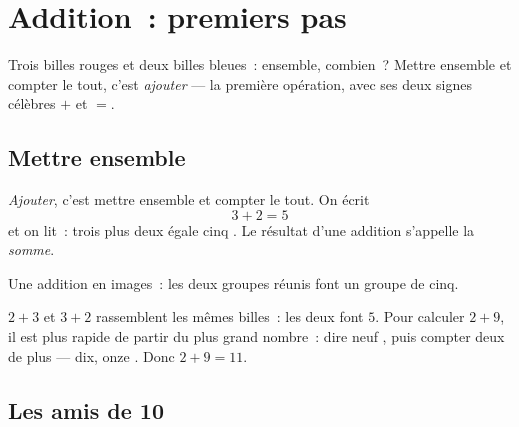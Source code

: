 \chapter{Addition~: premiers pas}\label{ch:g1:addition}

Trois billes rouges et deux billes bleues~: ensemble, combien~?
Mettre ensemble et compter le tout, c'est \emph{ajouter} --- la
première opération, avec ses deux signes célèbres $+$ et $=$.

\section{Mettre ensemble}

\begin{definition}[Addition]\label{def:g1:addition:def}
\emph{Ajouter}, c'est mettre ensemble et compter le tout. On écrit
\[
3 + 2 = 5
\]
et on lit~: \guillemotleft{} trois plus deux égale cinq
\guillemotright{}. Le résultat d'une addition s'appelle la
\emph{somme}.
\end{definition}

\begin{omfigure}

{\small Une addition en images~: les deux groupes réunis font un
groupe de cinq.}
\end{omfigure}

\begin{example}\label{ex:g1:addition:order}
$2 + 3$ et $3 + 2$ rassemblent les mêmes billes~: les deux font
$5$. Pour calculer $2 + 9$, il est plus rapide de partir du plus grand
nombre~: dire \guillemotleft{} neuf \guillemotright{}, puis compter
deux de plus --- \guillemotleft{} dix, onze \guillemotright{}. Donc
$2 + 9 = 11$.
\end{example}

\section{Les amis de 10}

